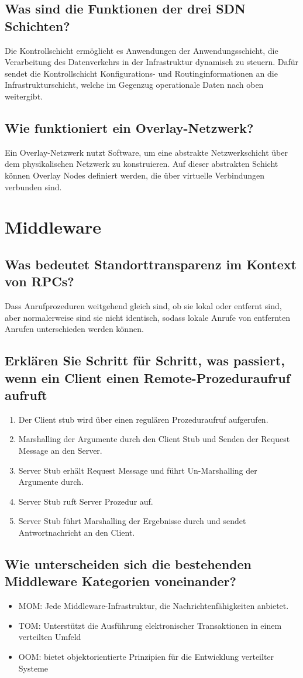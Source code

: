 \documentclass{article}
\begin{document}
\subsection{Was sind die Funktionen der drei SDN Schichten?}
Die Kontrollschicht ermöglicht es Anwendungen der Anwendungsschicht, die Verarbeitung des Datenverkehrs in der Infrastruktur dynamisch zu steuern. Dafür sendet die Kontrollschicht Konfigurations- und Routinginformationen an die Infrastrukturschicht, welche im Gegenzug operationale Daten nach oben weitergibt.
\subsection{Wie funktioniert ein Overlay-Netzwerk?}
Ein Overlay-Netzwerk nutzt Software, um eine abstrakte Netzwerkschicht über dem physikalischen Netzwerk zu konstruieren. Auf dieser abstrakten Schicht können Overlay Nodes definiert werden, die über virtuelle Verbindungen verbunden sind.
\section{Middleware}
\subsection{Was bedeutet Standorttransparenz im Kontext von RPCs?}
Dass Anrufprozeduren weitgehend gleich sind, ob sie lokal oder entfernt sind, aber normalerweise sind sie nicht identisch, sodass lokale Anrufe von entfernten Anrufen unterschieden werden können.
\subsection{Erklären Sie Schritt für Schritt, was passiert, wenn ein Client einen Remote-Prozeduraufruf aufruft}
\begin{enumerate}
    \item Der Client stub wird über einen regulären Prozeduraufruf aufgerufen.
    \item Marshalling der Argumente durch den Client Stub und Senden der Request Message an den Server.
    \item Server Stub erhält Request Message und führt Un-Marshalling der Argumente durch.
    \item Server Stub ruft Server Prozedur auf.
    \item Server Stub führt Marshalling der Ergebnisse durch und sendet Antwortnachricht an den Client.
\end{enumerate}
\subsection{Wie unterscheiden sich die bestehenden Middleware Kategorien voneinander?}
\begin{itemize}
    \item MOM: Jede Middleware-Infrastruktur, die Nachrichtenfähigkeiten anbietet.
    \item TOM: Unterstützt die Ausführung elektronischer Transaktionen in einem verteilten Umfeld
    \item OOM: bietet objektorientierte Prinzipien für die Entwicklung verteilter Systeme
\end{itemize}
\end{document}
